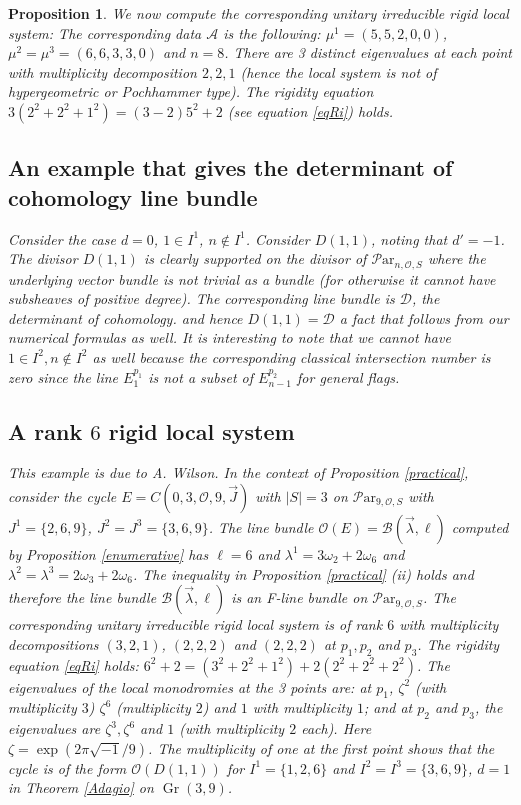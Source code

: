 \documentclass[11pt]{amsart}
\newcommand\Par{\mathcal{P}\text{ar} }
\newcommand\Gr{\operatorname{Gr}}
\newtheorem{proposition}[theorem]{Proposition}
\numberwithin{theorem}{subsection}
\begin{document}
{\begin{proposition}
We now compute the corresponding unitary irreducible rigid local system: The corresponding data $\mathcal{A}$ is the following: $\mu^1=(5,5,2,0,0)$,
$\mu^2=\mu^3=(6,6,3,3,0)$ and $n=8$.  There are 3 distinct eigenvalues at each point with multiplicity decomposition $2,2,1$ (hence the local system is not  of hypergeometric or Pochhammer type). The rigidity equation $3(2^2+2^2+1^2)=(3-2)5^2+2$ (see equation \eqref{eqRi}) holds.
\fi
\subsection{An example that gives the determinant of cohomology  line bundle}
Consider  the case $d=0$, $1\in I^1$, $n\not\in I^1$. Consider $D(1,1)$, noting that  $d'=-1$.
The divisor $D(1,1)$ is clearly supported on  the divisor of $\Par_{n,\mathcal{O},S}$ where the underlying vector bundle is not trivial as a bundle (for otherwise it cannot have subsheaves of positive degree).  The corresponding line bundle is $\mathcal{D}$,  the determinant of cohomology. and hence $D(1,1)=\mathcal{D}$ a fact that follows from our numerical formulas as well.
It is interesting to note that we cannot have $1\in I^2, n\not\in I^2$  as well because the corresponding classical intersection number is zero since the line  $E^{p_1}_1$ is not  a subset of  $E^{p_2}_{n-1}$ for general flags.





\subsection{A rank $6$ rigid local system}\label{wilson}
This example is due to A. Wilson. In the context of Proposition  \ref{practical}, consider the cycle $E=C(0,3,\mathcal{O},9,\vec{J})$ with $|S|=3$ on $\Par_{9,\mathcal{O},S}$ with
$J^1=\{2,6,9\}$, $J^2=J^3=\{3,6,9\}$. The line bundle $\mathcal{O}(E)=\mathcal{B}(\vec{\lambda},\ell)$ computed by Proposition  \ref{enumerative} has $\ell=6$ and $\lambda^1= 3\omega_2+2\omega_6$ and $\lambda^2=\lambda^3=2\omega_3+ 2\omega_6$. The inequality in Proposition  \ref{practical} (ii) holds and therefore the line bundle $\mathcal{B}(\vec{\lambda},\ell)$ is an F-line bundle on $\Par_{9,\mathcal{O},S}$. The corresponding unitary irreducible rigid local system is of rank $6$ with multiplicity decompositions $(3,2,1)$, $(2,2,2)$ and $(2,2,2)$ at $p_1,p_2$ and $p_3$. The rigidity equation \eqref{eqRi} holds:
$6^2+2=(3^2+2^2+1^2) + 2(2^2+2^2+2^2)$. The eigenvalues of the local monodromies at the 3 points are: at $p_1$, $\zeta^2$ (with multiplicity $3$) $\zeta^6$ (multiplicity $2$) and $1$ with multiplicity $1$; and at $p_2$ and $p_3$, the eigenvalues are $\zeta^3,\zeta^6$ and $1$ (with multiplicity $2$ each). Here $\zeta=\exp(2\pi\sqrt{-1}/9)$. The multiplicity of one at the first point shows that the cycle is of the form $\mathcal{O}(D(1,1))$ for $I^1=\{1,2,6\}$ and $I^2=I^3=\{3,6,9\}$, $d=1$ in Theorem \ref{Adagio} on $\Gr(3,9)$.


\end{proposition}}
\end{document}
